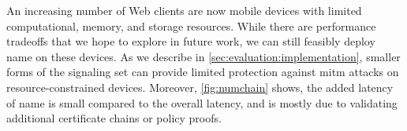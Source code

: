 An increasing number of Web clients are now mobile devices with limited
computational, memory, and storage resources. While there are performance
tradeoffs that we hope to explore in future work, we can still feasibly deploy
\ac{name} on these devices. As we describe in
\autoref{sec:evaluation:implementation}, smaller forms of the signaling set can
provide limited protection against \ac{mitm} attacks on resource-constrained
devices. Moreover, \autoref{fig:numchain} shows, the added latency of \ac{name}
is small compared to the overall latency, and is mostly due to validating
additional certificate chains or policy proofs.
